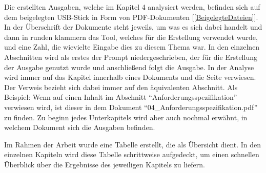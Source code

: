 Die erstellten Ausgaben, welche im Kapitel 4 analysiert werden, befinden sich auf dem beigelegten USB-Stick 
in Form von PDF-Dokumenten [\autoref{BeigelegteDateien}]. In der Überschrift der Dokumente steht jeweils, 
um was es sich dabei handelt und dann in runden klammern das Tool, welches für die Erstellung verwendet 
wurde, und eine Zahl, die wievielte Eingabe dies zu diesem Thema war. In den einzelnen Abschnitten wird als erstes der 
Prompt niedergeschrieben, der für die Erstellung der Ausgabe genutzt wurde und anschließend folgt die Ausgabe. In der Analyse wird immer auf 
das Kapitel innerhalb eines Dokuments und die Seite verwiesen. Der Verweis bezieht sich dabei immer auf 
den äquivalenten Abschnitt. Als Beispiel: Wenn auf einen Inhalt im Abschnitt ``Anforderungsspezifikation'' verwiesen wird, 
ist dieser in dem Dokument ``04\_Anforderungsspezifikation.pdf'' zu finden. Zu beginn jedes Unterkapitels wird aber auch nochmal 
erwähnt, in welchem Dokument sich die Ausgaben befinden.

Im Rahmen der Arbeit wurde eine Tabelle erstellt, die als Übersicht dient. In den einzelnen Kapiteln wird diese Tabelle 
schrittweise aufgedeckt, um einen schnellen Überblick über die Ergebnisse des jeweiligen Kapitels zu liefern.